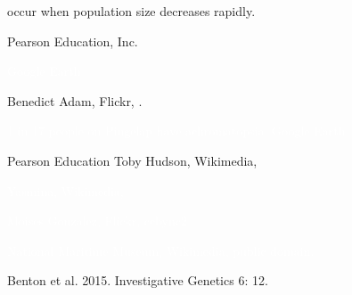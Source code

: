 \documentclass[t]{beamer}
\newcommand{\blurred}[3]{
\draw [black!#1] node at (#2,#2) {#3};
\draw [black!#1] node at (0,#2) {#3};
\draw [black!#1] node at (#2,0) {#3};
\draw [black!#1] node at (-#2,#2) {#3};
\draw [black!#1] node at (-#2,0) {#3};
\draw [black!#1] node at (0,-#2) {#3};
\draw [black!#1] node at (#2,-#2) {#3};
\draw [black!#1] node at (-#2,-#2) {#3};
}
\newcommand{\blurry}[1]{
\blurred{5}{0.04}{#1}
\blurred{13}{0.017}{#1}
\blurred{10}{0.012}{#1}
\blurred{15}{0.007}{#1}
\blurred{20}{0.003}{#1}
\blurred{10}{0.0015}{#1}
\draw [black!40] node at (0,0) {#1};
}
\begin{document}
%
{
\begin{frame}[b]{ occur when population size decreases rapidly.}

	\hfill \tiny \textcopyright Pearson Education, Inc.
\end{frame}
}
%
%
{
\begin{frame}[b]{}
\end{frame}
}
%
{
\begin{frame}[b]{}
	\hfill \tiny \textcolor{white}{Google Earth}
\end{frame}
}
%
{
\begin{frame}[b]{}
	\tiny Benedict Adam, Flickr, .
\end{frame}
}
%
{
\begin{frame}[b]{}
\end{frame}
}
%
%
{
\begin{frame}[b]{\textcolor{white}{1 in 17 people on Pingelap have achromatopsia.}}
	\hfill \tiny \textcolor{white}{Google Earth}
\end{frame}
}
%
{
\begin{frame}[b,plain]{}
	\tiny \textcopyright Pearson Education \hfill Toby Hudson, Wikimedia, 
\end{frame}
}
%
%
{
\begin{frame}[b]{}
	\hfill \textcolor{white}{\tiny Yasmina, Wikimedia, }
\end{frame}
}
%
{
\begin{frame}[b]{}
	\hfill \textcolor{white}{\tiny Moises Gonzalez, Flickr, ccbync{2}}
\end{frame}
}
%
{
\begin{frame}[b]{}
	\hfill \textcolor{white}{\tiny National Maritime Museum, Wikimedia, public domain.}
\end{frame}
}
%
{
\begin{frame}[b]{}
	\tiny Benton et al. 2015. Investigative Genetics 6: 12.
\end{frame}
}
%
\end{document}
